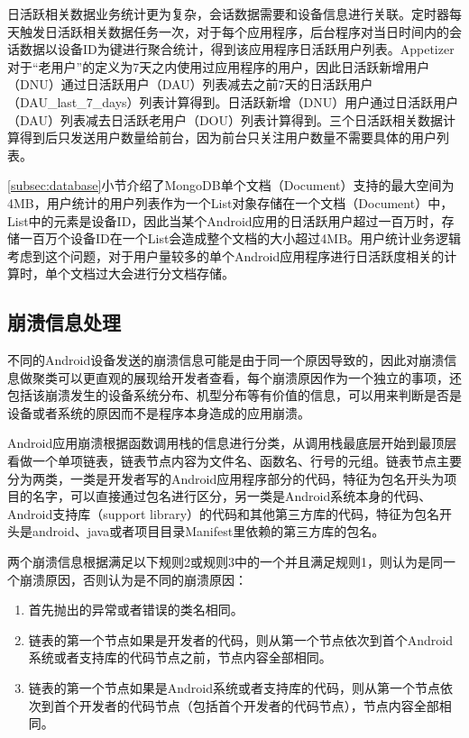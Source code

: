 日活跃相关数据业务统计更为复杂，会话数据需要和设备信息进行关联。定时器每天触发日活跃相关数据任务一次，对于每个应用程序，后台程序对当日时间内的会话数据以设备ID为键进行聚合统计，得到该应用程序日活跃用户列表。Appetizer对于“老用户”的定义为7天之内使用过应用程序的用户，因此日活跃新增用户（DNU）通过日活跃用户（DAU）列表减去之前7天的日活跃用户（DAU\_last\_7\_days）列表计算得到。日活跃新增（DNU）用户通过日活跃用户（DAU）列表减去日活跃老用户（DOU）列表计算得到。三个日活跃相关数据计算得到后只发送用户数量给前台，因为前台只关注用户数量不需要具体的用户列表。

\ref{subsec:database}小节介绍了MongoDB单个文档（Document）支持的最大空间为4MB，用户统计的用户列表作为一个List对象存储在一个文档（Document）中，List中的元素是设备ID，因此当某个Android应用的日活跃用户超过一百万时，存储一百万个设备ID在一个List会造成整个文档的大小超过4MB。用户统计业务逻辑考虑到这个问题，对于用户量较多的单个Android应用程序进行日活跃度相关的计算时，单个文档过大会进行分文档存储。

\subsection{崩溃信息处理}
\label{subsec:crashcomputing}

不同的Android设备发送的崩溃信息可能是由于同一个原因导致的，因此对崩溃信息做聚类可以更直观的展现给开发者查看，每个崩溃原因作为一个独立的事项，还包括该崩溃发生的设备系统分布、机型分布等有价值的信息，可以用来判断是否是设备或者系统的原因而不是程序本身造成的应用崩溃。

Android应用崩溃根据函数调用栈的信息进行分类，从调用栈最底层开始到最顶层看做一个单项链表，链表节点内容为文件名、函数名、行号的元组。链表节点主要分为两类，一类是开发者写的Android应用程序部分的代码，特征为包名开头为项目的名字，可以直接通过包名进行区分，另一类是Android系统本身的代码、Android支持库（support library）的代码和其他第三方库的代码，特征为包名开头是android、java或者项目目录Manifest里依赖的第三方库的包名。

两个崩溃信息根据满足以下规则2或规则3中的一个并且满足规则1，则认为是同一个崩溃原因，否则认为是不同的崩溃原因：

\begin{enumerate}
	\item 首先抛出的异常或者错误的类名相同。
	\item 链表的第一个节点如果是开发者的代码，则从第一个节点依次到首个Android系统或者支持库的代码节点之前，节点内容全部相同。
	\item 链表的第一个节点如果是Android系统或者支持库的代码，则从第一个节点依次到首个开发者的代码节点（包括首个开发者的代码节点），节点内容全部相同。
\end{enumerate}

